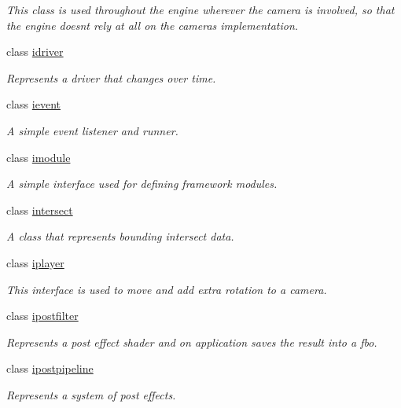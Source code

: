 \begin{DoxyCompactItemize}
\begin{DoxyCompactList}\small\item\em This class is used throughout the engine wherever the camera is involved, so that the engine doesn\textquotesingle{}t rely at all on the camera\textquotesingle{}s implementation. \end{DoxyCompactList}\item 
class \hyperlink{classflounder_1_1idriver}{idriver}
\begin{DoxyCompactList}\small\item\em Represents a driver that changes over time. \end{DoxyCompactList}\item 
class \hyperlink{classflounder_1_1ievent}{ievent}
\begin{DoxyCompactList}\small\item\em A simple event listener and runner. \end{DoxyCompactList}\item 
class \hyperlink{classflounder_1_1imodule}{imodule}
\begin{DoxyCompactList}\small\item\em A simple interface used for defining framework modules. \end{DoxyCompactList}\item 
class \hyperlink{classflounder_1_1intersect}{intersect}
\begin{DoxyCompactList}\small\item\em A class that represents bounding intersect data. \end{DoxyCompactList}\item 
class \hyperlink{classflounder_1_1iplayer}{iplayer}
\begin{DoxyCompactList}\small\item\em This interface is used to move and add extra rotation to a camera. \end{DoxyCompactList}\item 
class \hyperlink{classflounder_1_1ipostfilter}{ipostfilter}
\begin{DoxyCompactList}\small\item\em Represents a post effect shader and on application saves the result into a fbo. \end{DoxyCompactList}\item 
class \hyperlink{classflounder_1_1ipostpipeline}{ipostpipeline}
\begin{DoxyCompactList}\small\item\em Represents a system of post effects. \end{DoxyCompactList}\item 

\end{DoxyCompactItemize}
